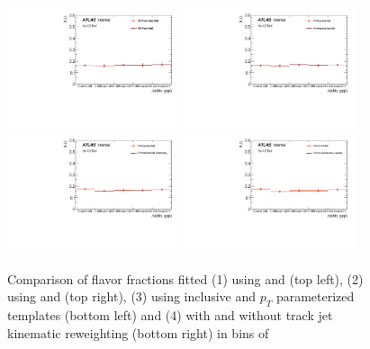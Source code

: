 \begin{figure}[htbp]
  \centering
 \includegraphics[width=0.45\textwidth]{figures/gbb/Sub_Sd0_Fits/Canv_dphi_leadCrossCheck.pdf}
 \includegraphics[width=0.45\textwidth]{figures/gbb/Sub_Sd0_Fits/Canv_dphi_subsubCrossCheck.pdf}\\
 \includegraphics[width=0.45\textwidth]{figures/gbb/Sub_Sd0_Fits/Canv_dphi_ptbinCrossCheck.pdf}
 \includegraphics[width=0.45\textwidth]{figures/gbb/Sub_Sd0_Fits/Canv_dphi_noreweightCrossCheck.pdf}\\
\caption{Comparison of flavor fractions fitted (1) using \subsdzero and \sdzero (top left), (2) using \subsdzero and \subsubsdzero (top right), (3) using inclusive and $p_T$ parameterized templates (bottom left) and (4) with and without track jet kinematic reweighting (bottom right) in bins of \dphi}
  \label{fig:dphi-fitfrac-crosscheck}
\end{figure}


\clearpage

